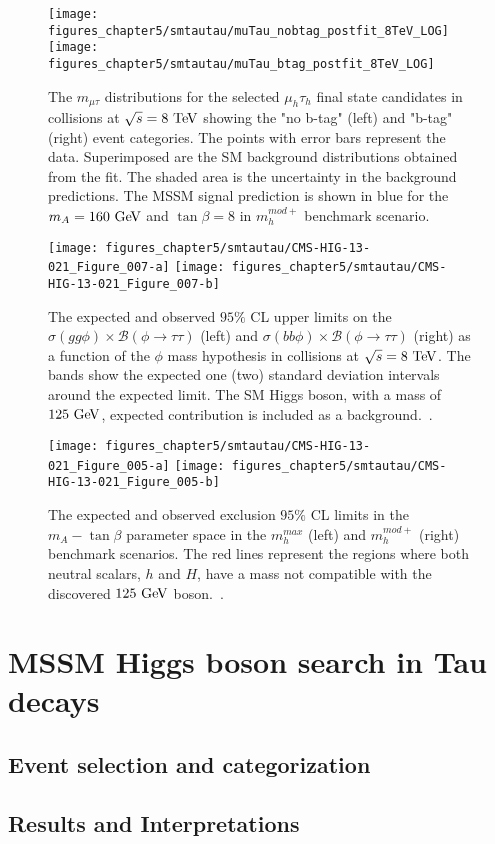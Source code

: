 \begin{figure}[htbp]
\centering
\texttt{[image: figures\_chapter5/smtautau/muTau\_nobtag\_postfit\_8TeV\_LOG]}
\texttt{[image: figures\_chapter5/smtautau/muTau\_btag\_postfit\_8TeV\_LOG]}
\caption{The $m_{\mu\tau}$ distributions for the selected $\mu_{h}\tau_{h}$ final state candidates in collisions at $\sqrt{s}=8~\mathrm{Te\kern -0.1em V}$ showing the "no b-tag" (left) and "b-tag" (right) event categories. The points with error bars represent the data. Superimposed are the SM background distributions obtained from the fit. The shaded area is the uncertainty in the background predictions. The MSSM signal prediction is shown in blue for the $m_{A}=160~\mathrm{Ge\kern -0.1em V}$ and $\tan \beta=8$ in $m_{h}^{mod+}$ benchmark scenario.}
\label{fig:mssmmutauh}
\end{figure}

\begin{figure}[htbp]
\centering
\texttt{[image: figures\_chapter5/smtautau/CMS-HIG-13-021\_Figure\_007-a]}
\texttt{[image: figures\_chapter5/smtautau/CMS-HIG-13-021\_Figure\_007-b]}
\caption{The expected and observed $95\%$ CL upper limits on the $\sigma(gg\phi) \times \mathcal{B}(\phi \rightarrow\tau\tau)$ (left) and $\sigma(bb\phi) \times \mathcal{B}(\phi \rightarrow \tau\tau)$ (right) as a function of the $\phi$ mass hypothesis in collisions at $\sqrt{s}=8~\mathrm{Te\kern -0.1em V}$. The bands show the expected one (two) standard deviation intervals around the expected limit. The SM Higgs boson, with a mass of $125~\mathrm{Ge\kern -0.1em V}$, expected contribution is included as a background.~\cite{Khachatryan:2014wca}.}
\label{fig:mssmtautau}
\end{figure}

\begin{figure}[htbp]
\centering
\texttt{[image: figures\_chapter5/smtautau/CMS-HIG-13-021\_Figure\_005-a]}
\texttt{[image: figures\_chapter5/smtautau/CMS-HIG-13-021\_Figure\_005-b]}
\caption{The expected and observed exclusion $95\%$ CL limits in the $m_{A}-\tan\beta$ parameter space in the $m_h^{max}$ (left) and $m_{h}^{mod+}$ (right) benchmark scenarios. The red lines represent the regions where both neutral scalars, $h$ and $H$, have a mass not compatible with the discovered $125~\mathrm{Ge\kern -0.1em V}$ boson.~\cite{Khachatryan:2014wca}.}
\label{fig:mssmlimit}
\end{figure}


\section{MSSM Higgs boson search in Tau decays}

\subsection{Event selection and categorization}

\subsection{Results and Interpretations}


